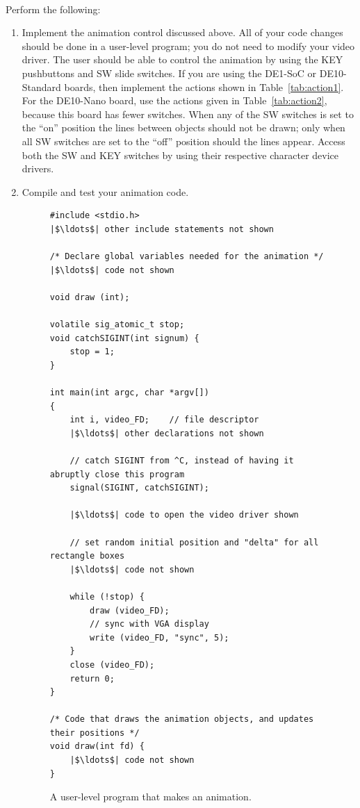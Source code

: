 \documentclass[epsfig,10pt,fullpage]{article}
\begin{document}
~\\
\noindent
Perform the following:

\begin{enumerate}
\item Implement the animation control discussed above. All of your code changes
should be done in a user-level program; you do not need to modify your video driver.
The user should be able to control the animation by using the KEY pushbuttons and SW slide
switches. If you are using the DE1-SoC or DE10-Standard boards, then implement the actions 
shown in Table~\ref{tab:action1}. For the DE10-Nano board, use the actions given in 
Table~\ref{tab:action2}, because this board has fewer switches. 
When any of the SW switches is set to the ``on'' position the lines between objects should 
not be drawn; only when all SW switches are set to the ``off'' position should the 
lines appear. Access both the SW and KEY switches by using their respective character 
device drivers. 

\item Compile and test your animation code.
\newpage
\lstset{language=C,numbers=none}
\begin{figure}[H]
\begin{center}
\begin{minipage}[t]{15 cm}
\begin{lstlisting}[name=part4]
#include <stdio.h>
|$\ldots$| other include statements not shown

/* Declare global variables needed for the animation */
|$\ldots$| code not shown

void draw (int);

volatile sig_atomic_t stop;
void catchSIGINT(int signum) {
    stop = 1;
}

int main(int argc, char *argv[])
{
    int i, video_FD;    // file descriptor
    |$\ldots$| other declarations not shown
    
    // catch SIGINT from ^C, instead of having it abruptly close this program
    signal(SIGINT, catchSIGINT);
    
    |$\ldots$| code to open the video driver shown

    // set random initial position and "delta" for all rectangle boxes
    |$\ldots$| code not shown

    while (!stop) {
        draw (video_FD);
        // sync with VGA display 
        write (video_FD, "sync", 5);
    }
    close (video_FD);
    return 0;
}

/* Code that draws the animation objects, and updates their positions */
void draw(int fd) {
    |$\ldots$| code not shown
}
\end{lstlisting}
\end{minipage}
\caption{A user-level program that makes an animation.}
\label{fig:part4}
\end{center}
\end{figure}
\end{enumerate}
\end{document}
